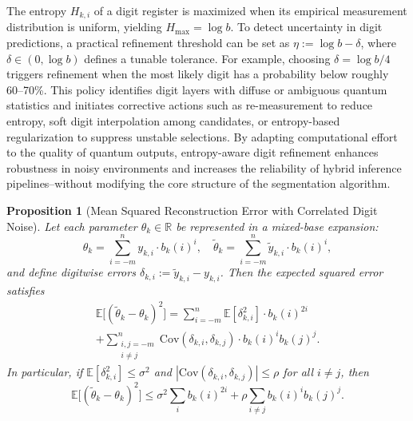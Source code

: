 \documentclass[aps,twocolumn,superscriptaddress,nofootinbib]{revtex4}
\newtheorem{proposition}{Proposition}
\begin{document}
The entropy \( H_{k,i} \) of a digit register is maximized when its empirical measurement distribution is uniform, yielding \( H_{\text{max}} = \log b \). To detect uncertainty in digit predictions, a practical refinement threshold can be set as \( \eta := \log b - \delta \), where \( \delta \in (0, \log b) \) defines a tunable tolerance. For example, choosing \( \delta = \log b / 4 \) triggers refinement when the most likely digit has a probability below roughly 60--70\%. This policy identifies digit layers with diffuse or ambiguous quantum statistics and initiates corrective actions such as re-measurement to reduce entropy, soft digit interpolation among candidates, or entropy-based regularization to suppress unstable selections. By adapting computational effort to the quality of quantum outputs, entropy-aware digit refinement enhances robustness in noisy environments and increases the reliability of hybrid inference pipelines--without modifying the core structure of the segmentation algorithm.

\begin{proposition}[Mean Squared Reconstruction Error with Correlated Digit Noise]\label{prop_ed}
Let each parameter \( \theta_k \in \mathbb{R} \) be represented in a mixed-base expansion:
\[
\theta_k = \sum_{i = -m}^{n} y_{k,i} \cdot b_k(i)^i, \quad 
\tilde{\theta}_k = \sum_{i = -m}^{n} \tilde{y}_{k,i} \cdot b_k(i)^i,
\]
and define digitwise errors \( \delta_{k,i} := \tilde{y}_{k,i} - y_{k,i} \). Then the expected squared error satisfies
\begin{multline}
\mathbb{E}\big[(\tilde{\theta}_k - \theta_k)^2\big] = \sum_{i=-m}^{n} \mathbb{E}[\delta_{k,i}^2] \cdot b_k(i)^{2i} \\
+ \sum_{\substack{i,j = -m \\ i \neq j}}^{n} \mathrm{Cov}(\delta_{k,i}, \delta_{k,j}) \cdot b_k(i)^i b_k(j)^j.
\end{multline}
In particular, if \( \mathbb{E}[\delta_{k,i}^2] \leq \sigma^2 \) and \( |\mathrm{Cov}(\delta_{k,i}, \delta_{k,j})| \leq \rho \) for all \( i \neq j \), then
\begin{equation}
\mathbb{E}\big[(\tilde{\theta}_k - \theta_k)^2\big] 
\leq \sigma^2 \sum_i b_k(i)^{2i} + \rho \sum_{i \neq j} b_k(i)^i b_k(j)^j.
\end{equation}
\end{proposition}
\end{document}
